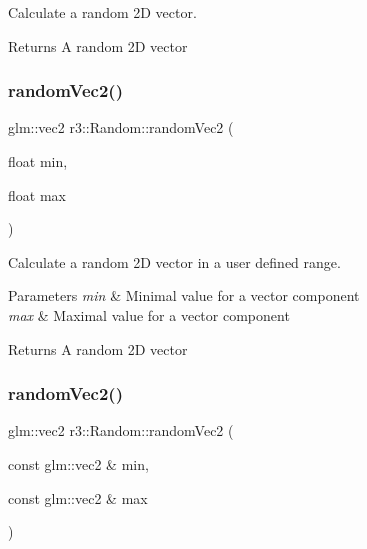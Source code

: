 Calculate a random 2D vector. 

\begin{DoxyReturn}{Returns}
A random 2D vector 
\end{DoxyReturn}
\mbox{\label{classr3_1_1_random_a3b1929d7308488b7016adaa24e93b2bb}} 
\subsubsection{\texorpdfstring{random\+Vec2()}{randomVec2()}\hspace{0.1cm}{\footnotesize\ttfamily [2/3]}}
{\footnotesize\ttfamily glm\+::vec2 r3\+::\+Random\+::random\+Vec2 (\begin{DoxyParamCaption}\item[{float}]{min,  }\item[{float}]{max }\end{DoxyParamCaption})\hspace{0.3cm}{\ttfamily [static]}}



Calculate a random 2D vector in a user defined range. 


\begin{DoxyParams}{Parameters}
{\em min} & Minimal value for a vector component \\
\hline
{\em max} & Maximal value for a vector component \\
\hline
\end{DoxyParams}
\begin{DoxyReturn}{Returns}
A random 2D vector 
\end{DoxyReturn}
\mbox{\label{classr3_1_1_random_a8c7e00a7b7e0fa8ce5c506e235bd6ed0}} 
\subsubsection{\texorpdfstring{random\+Vec2()}{randomVec2()}\hspace{0.1cm}{\footnotesize\ttfamily [3/3]}}
{\footnotesize\ttfamily glm\+::vec2 r3\+::\+Random\+::random\+Vec2 (\begin{DoxyParamCaption}\item[{const glm\+::vec2 \&}]{min,  }\item[{const glm\+::vec2 \&}]{max }\end{DoxyParamCaption})\hspace{0.3cm}{\ttfamily [static]}}



